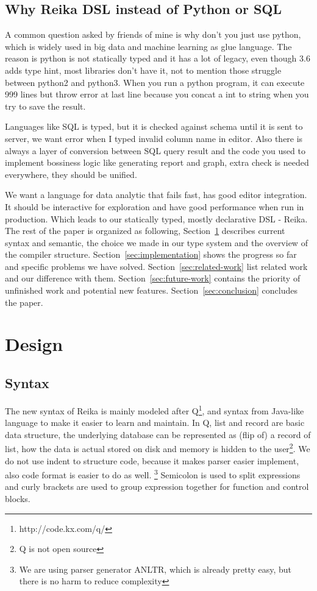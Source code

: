 \documentclass{article}
\begin{document}
\subsection{Why Reika DSL instead of Python or SQL}
\label{subsec:why-reika}

A common question asked by friends of mine is why don't you just use python,
which is widely used in big data and machine learning as glue language.
The reason is python is not statically typed and it has a lot of legacy,
even though 3.6 adds type hint, most libraries don't have it, not to mention those struggle between python2 and python3.
When you run a python program,
it can execute 999 lines but throw error at last line because you concat a int to string when you try to save the result.

Languages like SQL is typed, but it is checked against schema until it is sent to server,
we want error when I typed invalid column name in editor.
Also there is always a layer of conversion between SQL query result and the code you used to implement bossiness logic
like generating report and graph, extra check is needed everywhere, they should be unified.

We want a language for data analytic that fails fast, has good editor integration.
It should be interactive for exploration and have good performance when run in production.
Which leads to our statically typed, mostly declarative DSL - Reika.
The rest of the paper is organized as following,
Section~\ref{sec:design} describes current syntax and semantic,
the choice we made in our type system and the overview of the compiler structure.
Section~\ref{sec:implementation} shows the progress so far and specific problems we have solved.
Section~\ref{sec:related-work} list related work and our difference with them.
Section~\ref{sec:future-work} contains the priority of unfinished work and potential new features.
Section~\ref{sec:conclusion} concludes the paper.

\section{Design}
\label{sec:design}

\subsection{Syntax}
\label{subsec:syntax}

The new syntax of Reika is mainly modeled after Q\footnote{http://code.kx.com/q/},
and syntax from Java-like language to make it easier to learn and maintain.
In Q, list and record are basic data structure, the underlying database can be represented as (flip of) a record of list,
how the data is actual stored on disk and memory is hidden to the user\footnote{Q is not open source}.
We do not use indent to structure code, because it makes parser easier implement, also code format is easier to do as well.
\footnote{We are using parser generator ANLTR, which is already pretty easy, but there is no harm to reduce complexity}
Semicolon is used to split expressions and curly brackets are used to group expression together for function and control blocks.
\end{document}
